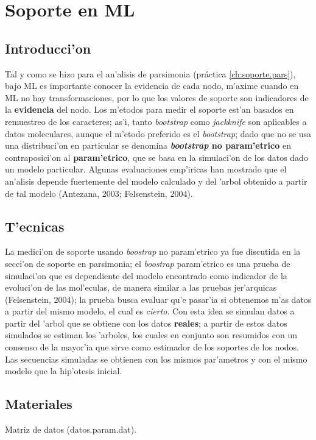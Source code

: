 \chapter{Soporte en ML}
\section*{Introducci'on}
Tal y como se hizo para el an'alisis de parsimonia (pr\'actica \ref{ch:soporte.pars}), bajo ML es importante conocer la evidencia de cada nodo, m'axime cuando en ML no hay transformaciones, por lo que los valores de soporte son indicadores de la \textbf{evidencia} del nodo. Los m'etodos para medir el soporte est'an basados en remuestreo de los caracteres; as'i, tanto \textit{bootstrap}  como \textit{jackknife}  son aplicables a datos moleculares, aunque el m'etodo preferido es el \textit{bootstrap}; dado que no se usa una distribuci'on en particular se denomina \textbf{\textit{bootstrap} no param'etrico} en contraposici'on al \textbf{param'etrico}, que se basa en la simulaci'on de los datos dado un modelo particular. Algunas evaluaciones emp'iricas han mostrado que el an'alisis depende fuertemente del modelo calculado y del 'arbol obtenido a partir de tal modelo (Antezana, 2003; Felsenstein, 2004).\\
\section{T'ecnicas}
La medici'on de soporte usando \textit{boostrap} no param'etrico ya fue discutida en la secci'on de soporte en parsimonia; el \textit{boostrap} param'etrico es una prueba de simulaci'on que es dependiente del modelo encontrado como indicador de la evoluci'on de las mol'eculas, de manera similar a las pruebas jer'arquicas (Felsenstein, 2004); la prueba busca evaluar qu'e pasar'ia si obtenemos m'as datos a partir del mismo modelo, el cual es \textit{cierto}. Con esta idea se simulan datos a partir del 'arbol que se obtiene con los datos \textbf{reales}; a partir de estos datos simulados se estiman los 'arboles, los cuales en conjunto son resumidos con un consenso de la mayor'ia que sirve como estimador de los soportes de los nodos. Las secuencias simuladas se obtienen con los mismos par'ametros y con el mismo modelo que la hip'otesis inicial.
\section{Materiales}
\noindent
Matriz de datos (datos.param.dat).
